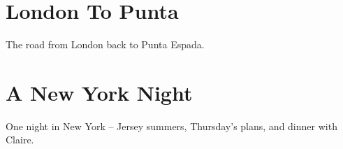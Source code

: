 \documentclass[a4paper]{memoir}
\begin{document}











%






\chapter{London To Punta}
The road from London back to Punta Espada.





\chapter{A New York Night}
One night in New York -- Jersey summers, Thursday's plans, and dinner with Claire.










\backmatter
\printindex[songs]
\clearpage
\printindex[tags]
\end{document}
